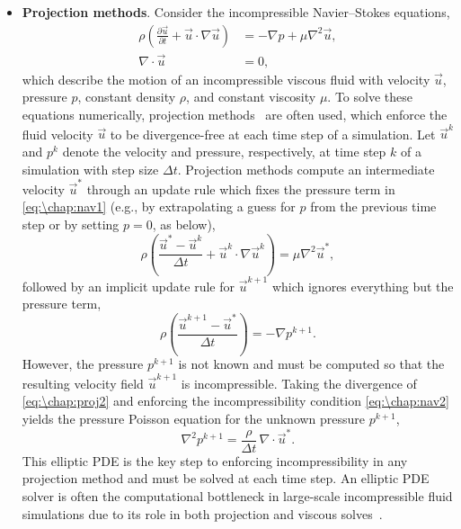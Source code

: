 \begin{itemize}
\item \textbf{Projection methods}. Consider the incompressible Navier--Stokes equations,
\begin{align}
\label{eq:\chap:nav1}
\rho \left( \frac{\partial \vec{u}}{\partial t} + \vec{u} \cdot \nabla \vec{u} \right) &= -\nabla p + \mu \nabla^2 \vec{u}, \\
\label{eq:\chap:nav2}
\nabla \cdot \vec{u} &= 0,
\end{align}
which describe the motion of an incompressible viscous fluid with velocity $\vec{u}$, pressure $p$, constant density $\rho$, and constant viscosity $\mu$. To solve these equations numerically, projection methods~\cite{Chorin_67_01,Chorin_68_01} are often used, which enforce the fluid velocity $\vec{u}$ to be divergence-free at each time step of a simulation. Let $\vec{u}^k$ and $p^k$ denote the velocity and pressure, respectively, at time step $k$ of a simulation with step size $\Delta t$. Projection methods compute an intermediate velocity $\vec{u}^*$ through an update rule which fixes the pressure term in \cref{eq:\chap:nav1} (e.g., by extrapolating a guess for $p$ from the previous time step or by setting $p=0$, as below),
\[
\rho\left( \frac{\vec{u}^* - \vec{u}^k}{\Delta t} + \vec{u}^k \cdot \nabla \vec{u}^k \right) = \mu \nabla^2 \vec{u}^*,
\]
followed by an implicit update rule for $\vec{u}^{k+1}$ which ignores everything but the pressure term,
\begin{equation}\label{eq:\chap:proj2}
\rho\left( \frac{\vec{u}^{k+1} - \vec{u}^*}{\Delta t} \right) =  -\nabla p^{k+1}.
\end{equation}
However, the pressure $p^{k+1}$ is not known and must be computed so that the resulting velocity field $\vec{u}^{k+1}$ is incompressible. Taking the divergence of \cref{eq:\chap:proj2} and enforcing the incompressibility condition \cref{eq:\chap:nav2} yields the pressure Poisson equation for the unknown pressure $p^{k+1}$,
\begin{equation}\label{eq:\chap:proj3}
\nabla^2 p^{k+1} = \frac{\rho}{\Delta t} \, \nabla \cdot \vec{u}^*.
\end{equation}
This elliptic PDE is the key step to enforcing incompressibility in any projection method and must be solved at each time step. An elliptic PDE solver is often the computational bottleneck in large-scale incompressible fluid simulations due to its role in both projection and viscous solves~\cite{Liu_16_01}.


\end{itemize}
